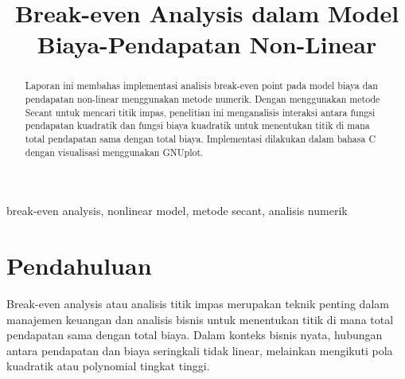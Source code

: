 \documentclass[conference]{IEEEtran}
\begin{document}
\title{Break-even Analysis dalam Model Biaya-Pendapatan Non-Linear}


\author{%
  \and%
  \and%
  \and%
  \and%
}
\maketitle

\begin{abstract}
Laporan ini membahas implementasi analisis break-even point pada model biaya dan pendapatan non-linear menggunakan metode numerik. Dengan menggunakan metode Secant untuk mencari titik impas, penelitian ini menganalisis interaksi antara fungsi pendapatan kuadratik dan fungsi biaya kuadratik untuk menentukan titik di mana total pendapatan sama dengan total biaya. Implementasi dilakukan dalam bahasa C dengan visualisasi menggunakan GNUplot.
\end{abstract}

\begin{IEEEkeywords}
break-even analysis, nonlinear model, metode secant, analisis numerik
\end{IEEEkeywords}

\section{Pendahuluan}
Break-even analysis atau analisis titik impas merupakan teknik penting dalam manajemen keuangan dan analisis bisnis untuk menentukan titik di mana total pendapatan sama dengan total biaya. Dalam konteks bisnis nyata, hubungan antara pendapatan dan biaya seringkali tidak linear, melainkan mengikuti pola kuadratik atau polynomial tingkat tinggi.
\end{document}
